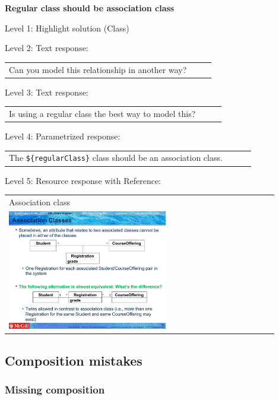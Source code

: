 \noindent \textbf{Regular class should be association class} \medskip

\noindent Level 1: Highlight solution (Class) \medskip

\noindent Level 2: Text response: \medskip

\begin{tabular}{|p{0.9\linewidth}}
Can you model this relationship in another way?
\end{tabular} \medskip

\noindent Level 3: Text response: \medskip

\begin{tabular}{|p{0.9\linewidth}}
Is using a regular class the best way to model this?
\end{tabular} \medskip

\noindent Level 4: Parametrized response: \medskip

\begin{tabular}{|p{0.9\linewidth}}
The \verb|${regularClass}| class should be an association class.
\end{tabular} \medskip

\noindent Level 5: Resource response with Reference: \medskip

\begin{tabular}{|p{0.9\linewidth}}
Association class

\\
\includegraphics[width=0.6\textwidth]{images/association_class.png}
\end{tabular} \medskip



\subsection{Composition mistakes}

\subsubsection{Missing composition}

